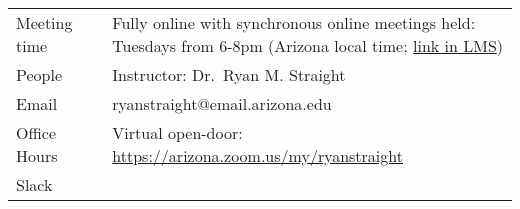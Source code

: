 \documentclass[]{article}
\begin{document}
\begin{longtable}[]{@{}lll@{}}
\toprule
\endhead
\begin{minipage}[t]{0.11\columnwidth}\raggedright
Meeting time\strut
\end{minipage} & \begin{minipage}[t]{0.02\columnwidth}\raggedright
\strut
\end{minipage} & \begin{minipage}[t]{0.78\columnwidth}\raggedright
Fully online with synchronous online meetings held: Tuesdays from 6-8pm
(Arizona local time; \href{https://d2l.arizona.edu}{link in LMS})\strut
\end{minipage}\tabularnewline
\begin{minipage}[t]{0.11\columnwidth}\raggedright
People\strut
\end{minipage} & \begin{minipage}[t]{0.02\columnwidth}\raggedright
\strut
\end{minipage} & \begin{minipage}[t]{0.78\columnwidth}\raggedright
Instructor: Dr.~Ryan M. Straight\strut
\end{minipage}\tabularnewline
\begin{minipage}[t]{0.11\columnwidth}\raggedright
Email\strut
\end{minipage} & \begin{minipage}[t]{0.02\columnwidth}\raggedright
\strut
\end{minipage} & \begin{minipage}[t]{0.78\columnwidth}\raggedright
ryanstraight@email.arizona.edu\strut
\end{minipage}\tabularnewline
\begin{minipage}[t]{0.11\columnwidth}\raggedright
Office Hours\strut
\end{minipage} & \begin{minipage}[t]{0.02\columnwidth}\raggedright
\strut
\end{minipage} & \begin{minipage}[t]{0.78\columnwidth}\raggedright
Virtual open-door: \url{https://arizona.zoom.us/my/ryanstraight}\strut
\end{minipage}\tabularnewline
\begin{minipage}[t]{0.11\columnwidth}\raggedright
Slack\strut
\end{minipage} & \begin{minipage}[t]{0.02\columnwidth}\raggedright
\strut
\end{minipage} & \begin{minipage}[t]{0.78\columnwidth}\raggedright

\end{minipage}
\end{longtable}
\end{document}
